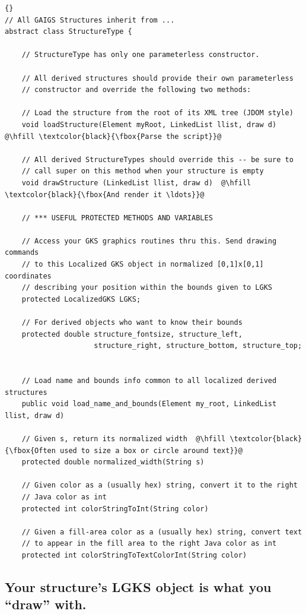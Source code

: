 \documentclass[12pt]{article}
\begin{document}
\begin{lstlisting}{}
// All GAIGS Structures inherit from ...
abstract class StructureType {

    // StructureType has only one parameterless constructor.

    // All derived structures should provide their own parameterless
    // constructor and override the following two methods:
    
    // Load the structure from the root of its XML tree (JDOM style)
    void loadStructure(Element myRoot, LinkedList llist, draw d)  @\hfill \textcolor{black}{\fbox{Parse the script}}@

    // All derived StructureTypes should override this -- be sure to
    // call super on this method when your structure is empty
    void drawStructure (LinkedList llist, draw d)  @\hfill \textcolor{black}{\fbox{And render it \ldots}}@

    // *** USEFUL PROTECTED METHODS AND VARIABLES

    // Access your GKS graphics routines thru this. Send drawing commands
    // to this Localized GKS object in normalized [0,1]x[0,1] coordinates
    // describing your position within the bounds given to LGKS 
    protected LocalizedGKS LGKS;

    // For derived objects who want to know their bounds
    protected double structure_fontsize, structure_left, 
                     structure_right, structure_bottom, structure_top;


    // Load name and bounds info common to all localized derived structures
    public void load_name_and_bounds(Element my_root, LinkedList llist, draw d) 

    // Given s, return its normalized width  @\hfill \textcolor{black}{\fbox{Often used to size a box or circle around text}}@
    protected double normalized_width(String s) 

    // Given color as a (usually hex) string, convert it to the right
    // Java color as int
    protected int colorStringToInt(String color) 

    // Given a fill-area color as a (usually hex) string, convert text
    // to appear in the fill area to the right Java color as int
    protected int colorStringToTextColorInt(String color) 
\end{lstlisting}


\subsection{Your structure's LGKS object is what you ``draw'' with.}
\end{document}
